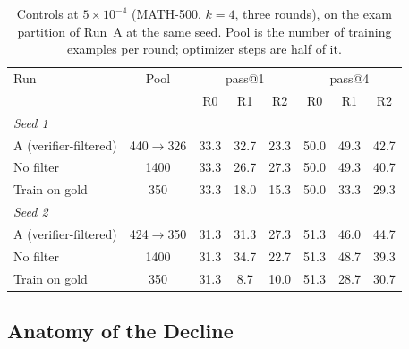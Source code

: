 \documentclass[runningheads]{llncs}
\begin{document}
\begin{table}[!htb]
\caption{Controls at $5\times10^{-4}$ (MATH-500, $k=4$, three rounds), on the
exam partition of Run~A at the same seed. Pool is the number of training
examples per round; optimizer steps are half of it.}
\label{tab:controls}
\centering
\setlength{\tabcolsep}{5pt}
\begin{tabular}{lccccccc}
\toprule
Run & Pool & \multicolumn{3}{c}{pass@1} & \multicolumn{3}{c}{pass@4} \\
 &  & R0 & R1 & R2 & R0 & R1 & R2 \\
\midrule
\multicolumn{8}{l}{\emph{Seed 1}} \\
A (verifier-filtered) & 440$\to$326 & 33.3 & 32.7 & 23.3 & 50.0 & 49.3 & 42.7 \\
No filter             & 1400 & 33.3 & 26.7 & 27.3 & 50.0 & 49.3 & 40.7 \\
Train on gold         & 350  & 33.3 & 18.0 & 15.3 & 50.0 & 33.3 & 29.3 \\
\midrule
\multicolumn{8}{l}{\emph{Seed 2}} \\
A (verifier-filtered) & 424$\to$350 & 31.3 & 31.3 & 27.3 & 51.3 & 46.0 & 44.7 \\
No filter             & 1400 & 31.3 & 34.7 & 22.7 & 51.3 & 48.7 & 39.3 \\
Train on gold         & 350  & 31.3 & 8.7 & 10.0 & 51.3 & 28.7 & 30.7 \\
\bottomrule
\end{tabular}
\end{table}

\subsection{Anatomy of the Decline}
\label{sec:anatomy}
\end{document}
